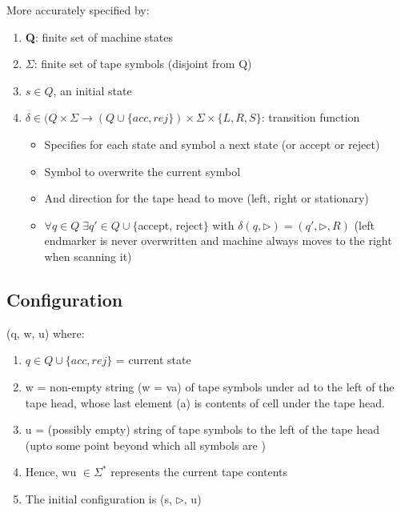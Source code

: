 \documentclass{article}
\begin{document}
\bigskip
\noindent
More accurately specified by:
\begin{enumerate}
    \item \textbf{Q}: finite set of machine states
    \item \textbf{$\Sigma$}: finite set of tape symbols (disjoint from Q)
    \item $s \in Q$, an initial state
    \item \textbf{$\delta \in (Q \times \Sigma \rightarrow (Q \cup \{ acc, rej \}) \times \Sigma \times \{ L, R, S \}$}: transition function
    \begin{itemize}
        \item Specifies for each state and symbol a next state (or accept or reject)
        \item Symbol to overwrite the current symbol
        \item And direction for the tape head to move (left, right or stationary)
        \item $\forall q \in Q \; \exists q' \in Q \cup \{$accept, reject$\}$ with $\delta (q, \triangleright ) = (q', \triangleright, R)$ (left endmarker is never overwritten and machine always moves to the right when scanning it)
    \end{itemize}
\end{enumerate}

\subsection{Configuration}
(q, w, u) where:
\begin{enumerate}
    \item $q \in Q \cup \{ acc, rej \}$ = current state
    \item w = non-empty string (w = va) of tape symbols under ad to the left of the tape head, whose last element (a) is contents of cell under the tape head.
    \item u = (possibly empty) string of tape symbols to the left of the tape head (upto some point beyond which all symbols are \textvisiblespace)
    \item Hence, wu $\in \Sigma^{*}$ represents the current tape contents
    \item The initial configuration is (s, $\triangleright$, u)
\end{enumerate}
\end{document}
